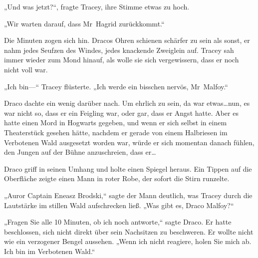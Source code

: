 „Und was jetzt?“, fragte Tracey, ihre Stimme etwas zu hoch.

„Wir warten darauf, dass Mr~Hagrid zurückkommt.“

Die Minuten zogen sich hin. Dracos Ohren schienen schärfer zu sein als sonst, er nahm jedes Seufzen des Windes, jedes knackende Zweiglein auf. Tracey sah immer wieder zum Mond hinauf, als wolle sie sich vergewissern, dass er noch nicht voll war.

„Ich bin—“ Tracey flüsterte. „Ich werde ein bisschen nervös, Mr~Malfoy.“

Draco dachte ein wenig darüber nach. Um ehrlich zu sein, da war etwas…nun, es war nicht so, dass er ein Feigling war, oder gar, dass er Angst hatte. Aber es hatte einen Mord in Hogwarts gegeben, und wenn er sich selbst in einem Theaterstück gesehen hätte, nachdem er gerade von einem Halbriesen im Verbotenen Wald ausgesetzt worden war, würde er sich momentan danach fühlen, den Jungen auf der Bühne anzuschreien, dass er…

Draco griff in seinen Umhang und holte einen Spiegel heraus. Ein Tippen auf die Oberfläche zeigte einen Mann in roter Robe, der sofort die Stirn runzelte.

„Auror Captain Eneasz Brodski,“ sagte der Mann deutlich, was Tracey durch die Lautstärke im stillen Wald aufschrecken ließ. „Was gibt es, Draco Malfoy?“

„Fragen Sie alle 10 Minuten, ob ich noch antworte,“ sagte Draco. Er hatte beschlossen, sich nicht direkt über sein Nachsitzen zu beschweren. Er wollte nicht wie ein verzogener Bengel aussehen. „Wenn ich nicht reagiere, holen Sie mich ab. Ich bin im Verbotenen Wald.“

